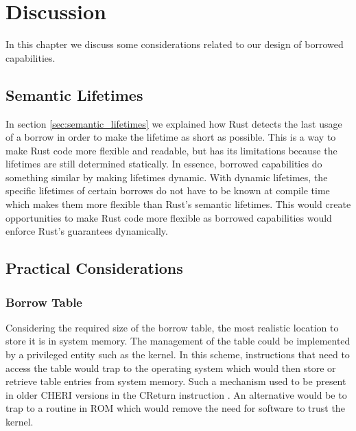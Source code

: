 \chapter{Discussion}
\label{chap:discussion}
In this chapter we discuss some considerations related to our design of borrowed capabilities.

\section{Semantic Lifetimes}
In section \ref{sec:semantic_lifetimes} we explained how Rust detects the last usage of a borrow in order to make the lifetime as short as possible.
This is a way to make Rust code more flexible and readable, but has its limitations because the lifetimes are still determined statically.
In essence, borrowed capabilities do something similar by making lifetimes dynamic.
With dynamic lifetimes, the specific lifetimes of certain borrows do not have to be known at compile time which makes them more flexible than Rust's semantic lifetimes.
This would create opportunities to make Rust code more flexible as borrowed capabilities would enforce Rust's guarantees dynamically.

\section{Practical Considerations}
\subsection{Borrow Table}
\label{sec:microarchbt}
Considering the required size of the borrow table, the most realistic location to store it is in system memory. The management of the table could be implemented by a privileged entity such as the kernel. In this scheme, instructions that need to access the table would trap to the operating system which would then store or retrieve table entries from system memory.
Such a mechanism used to be present in older CHERI versions in the CReturn instruction \cite{7723791}.
An alternative would be to trap to a routine in ROM which would remove the need for software to trust the kernel.

